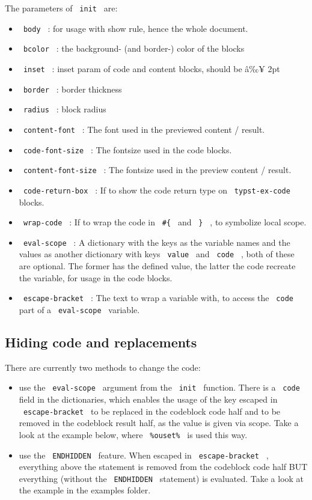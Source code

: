 The parameters of \texttt{\ init\ } are:

\begin{itemize}
\tightlist
\item
  \texttt{\ body\ } : for usage with show rule, hence the whole
  document.
\item
  \texttt{\ bcolor\ } : the background- (and border-) color of the
  blocks
\item
  \texttt{\ inset\ } : inset param of code and content blocks, should be
  â‰¥ 2pt
\item
  \texttt{\ border\ } : border thickness
\item
  \texttt{\ radius\ } : block radius
\item
  \texttt{\ content-font\ } : The font used in the previewed content /
  result.
\item
  \texttt{\ code-font-size\ } : The fontsize used in the code blocks.
\item
  \texttt{\ content-font-size\ } : The fontsize used in the preview
  content / result.
\item
  \texttt{\ code-return-box\ } : If to show the code return type on
  \texttt{\ typst-ex-code\ } blocks.
\item
  \texttt{\ wrap-code\ } : If to wrap the code in \texttt{\ \#\{\ } and
  \texttt{\ \}\ } , to symbolize local scope.
\item
  \texttt{\ eval-scope\ } : A dictionary with the keys as the variable
  names and the values as another dictionary with keys
  \texttt{\ value\ } and \texttt{\ code\ } , both of these are optional.
  The former has the defined value, the latter the code recreate the
  variable, for usage in the code blocks.
\item
  \texttt{\ escape-bracket\ } : The text to wrap a variable with, to
  access the \texttt{\ code\ } part of a \texttt{\ eval-scope\ }
  variable.
\end{itemize}

\subsection{Hiding code and
replacements}\label{hiding-code-and-replacements}

There are currently two methods to change the code:

\begin{itemize}
\tightlist
\item
  use the \texttt{\ eval-scope\ } argument from the \texttt{\ init\ }
  function. There is a \texttt{\ code\ } field in the dictionaries,
  which enables the usage of the key escaped in
  \texttt{\ escape-bracket\ } to be replaced in the codeblock code half
  and to be removed in the codeblock result half, as the value is given
  via scope. Take a look at the example below, where
  \texttt{\ \%ouset\%\ } is used this way.
\item
  use the \texttt{\ ENDHIDDEN\ } feature. When escaped in
  \texttt{\ escape-bracket\ } , everything above the statement is
  removed from the codeblock code half BUT everything (without the
  \texttt{\ ENDHIDDEN\ } statement) is evaluated. Take a look at the
  example in the examples folder.
\end{itemize}

